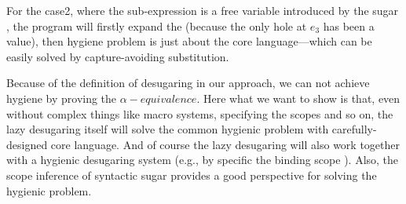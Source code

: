 For the case2, where the sub-expression  is a free variable introduced by the sugar , the program will firstly expand the  (because the only hole at $e_3$ has been a value), then hygiene problem is just about the core language---which can be easily solved by capture-avoiding substitution.


Because of the definition of desugaring in our approach, we can not achieve hygiene by proving the $\alpha-equivalence$.
Here what we want to show is that, even without complex things like macro systems, specifying the scopes and so on, the lazy desugaring itself will solve the common hygienic problem with carefully-designed core language. And of course the lazy desugaring will also work together with a hygienic desugaring system (e.g., by specific the binding scope \cite{10.5555/1792878.1792884}). Also, the scope inference of syntactic sugar\cite{resugaringscope} provides a good perspective for solving the hygienic problem.

